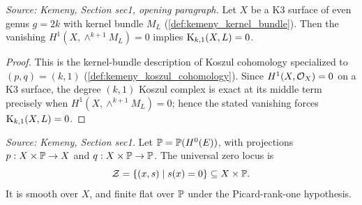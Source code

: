 \begin{lemma}
  \label{lem:kemeny_koszul_reduction}
  \textit{Source: Kemeny, Section sec1, opening paragraph.}
  Let \(X\) be a K3 surface of even genus \(g=2k\) with kernel bundle \(M_L\)
  (\cref{def:kemeny_kernel_bundle}).  Then the vanishing
  \(H^1(X,\wedge^{k+1}M_L)=0\) implies \(\mathrm{K}_{k,1}(X,L)=0\).
\end{lemma}
\begin{proof}
  This is the kernel-bundle description of Koszul cohomology specialized to
  \((p,q)=(k,1)\) (\cref{def:kemeny_koszul_cohomology}).  Since
  \(H^1(X,\mathcal{O}_X)=0\) on a K3 surface, the degree \((k,1)\) Koszul complex is
  exact at its middle term precisely when \(H^1(X,\wedge^{k+1}M_L)=0\); hence the
  stated vanishing forces \(\mathrm{K}_{k,1}(X,L)=0\).
\end{proof}

\begin{definition}
  \label{def:kemeny_universal_zero_locus}
  \textit{Source: Kemeny, Section sec1.}
  Let \(\mathbb{P}=\mathbb{P}(H^0(E))\), with projections \(p:X\times\mathbb{P}\to X\) and
  \(q:X\times\mathbb{P}\to\mathbb{P}\).  The universal zero locus is
  \[
    \mathcal{Z}=\{(x,s)\mid s(x)=0\}\subseteq X\times\mathbb{P} .
  \]
  It is smooth over \(X\), and finite flat over \(\mathbb{P}\) under the Picard-rank-one
  hypothesis.
\end{definition}

